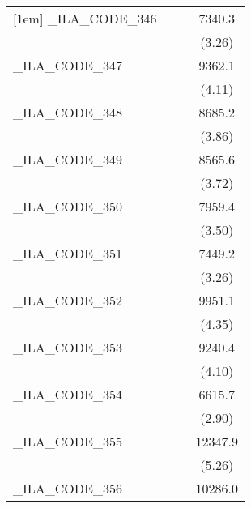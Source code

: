 {\begin{tabular}{l*{3}{c}}
[1em]
\_ILA\_CODE\_346&                     &                     &      7340.3\sym{**} \\
            &                     &                     &      (3.26)         \\
[1em]
\_ILA\_CODE\_347&                     &                     &      9362.1\sym{***}\\
            &                     &                     &      (4.11)         \\
[1em]
\_ILA\_CODE\_348&                     &                     &      8685.2\sym{***}\\
            &                     &                     &      (3.86)         \\
[1em]
\_ILA\_CODE\_349&                     &                     &      8565.6\sym{***}\\
            &                     &                     &      (3.72)         \\
[1em]
\_ILA\_CODE\_350&                     &                     &      7959.4\sym{***}\\
            &                     &                     &      (3.50)         \\
[1em]
\_ILA\_CODE\_351&                     &                     &      7449.2\sym{**} \\
            &                     &                     &      (3.26)         \\
[1em]
\_ILA\_CODE\_352&                     &                     &      9951.1\sym{***}\\
            &                     &                     &      (4.35)         \\
[1em]
\_ILA\_CODE\_353&                     &                     &      9240.4\sym{***}\\
            &                     &                     &      (4.10)         \\
[1em]
\_ILA\_CODE\_354&                     &                     &      6615.7\sym{**} \\
            &                     &                     &      (2.90)         \\
[1em]
\_ILA\_CODE\_355&                     &                     &     12347.9\sym{***}\\
            &                     &                     &      (5.26)         \\
[1em]
\_ILA\_CODE\_356&                     &                     &     10286.0\sym{***}\\

\end{tabular}}
